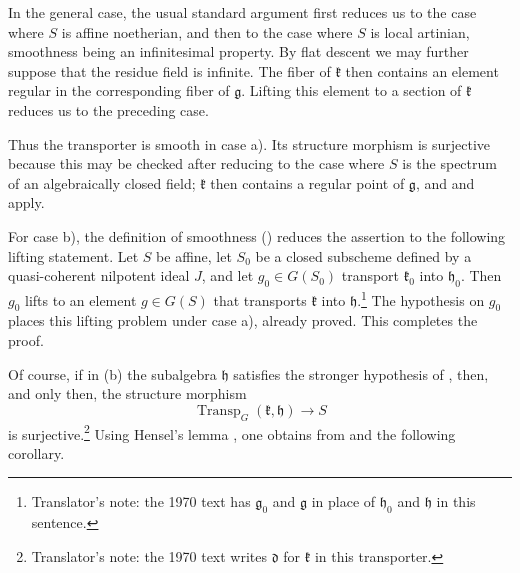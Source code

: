 In the general case, the usual standard argument first reduces us
to the case where \(S\) is affine noetherian, and then to the case
where \(S\) is local artinian, smoothness being an infinitesimal
property. By flat descent we may further suppose that the residue
field is infinite. The fiber of \(\mathfrak k\) then contains an
element regular in the corresponding fiber of \(\mathfrak g\).
Lifting this element to a section of \(\mathfrak k\) reduces us to
the preceding case.

Thus the transporter is smooth in case \textup{a)}. Its structure
morphism is surjective because this may be checked after reducing to
the case where \(S\) is the spectrum of an algebraically closed
field; \(\mathfrak k\) then contains a regular point of
\(\mathfrak g\), and  and  apply.

For case \textup{b)}, the definition of smoothness \textup{()}
reduces the assertion to the following lifting statement. Let \(S\)
be affine, let \(S_0\) be a closed subscheme defined by a
quasi-coherent nilpotent ideal \(J\), and let
\(g_0\in G(S_0)\) transport \(\mathfrak k_0\) into
\(\mathfrak h_0\). Then \(g_0\) lifts to an element \(g\in G(S)\)
that transports \(\mathfrak k\) into \(\mathfrak h\).\footnote{Translator's note: the 1970 text has \(\mathfrak g_0\) and \(\mathfrak g\) in place of \(\mathfrak h_0\) and \(\mathfrak h\) in this sentence.} The
hypothesis on \(g_0\) places this lifting problem under case
\textup{a)}, already proved. This completes the proof.

Of course, if in \textup{(b)} the subalgebra \(\mathfrak h\)
satisfies the stronger hypothesis of , then, and only then, the
structure morphism
\[
  \operatorname{Transp}_G(\mathfrak k,\mathfrak h)
  \longrightarrow S
\]
is surjective.\footnote{Translator's note: the 1970 text writes \(\mathfrak d\) for \(\mathfrak k\) in this transporter.} Using Hensel's lemma , one obtains from 
and  the following corollary.
